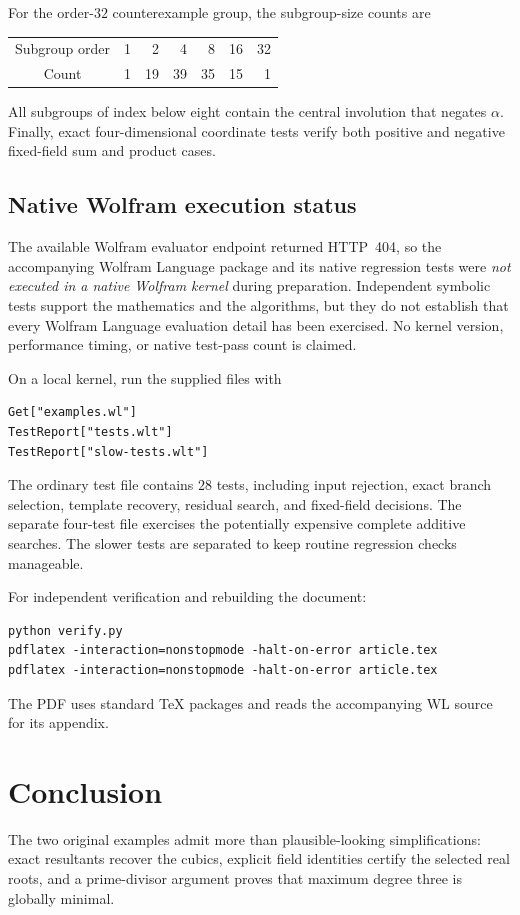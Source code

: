 \documentclass[11pt,letterpaper]{article}
\theoremstyle{definition}\newtheorem{definition}[theorem]{Definition}
\theoremstyle{remark}\newtheorem{remark}[theorem]{Remark}
\begin{document}
For the order-$32$ counterexample group, the subgroup-size counts are
\begin{center}
\begin{tabular}{crrrrrr}
\toprule
Subgroup order & 1 & 2 & 4 & 8 & 16 & 32\\
Count & 1 & 19 & 39 & 35 & 15 & 1\\\bottomrule
\end{tabular}
\end{center}
All subgroups of index below eight contain the central involution that negates $\alpha$. Finally, exact four-dimensional coordinate tests verify both positive and negative fixed-field sum and product cases.

\subsection{Native Wolfram execution status}
The available Wolfram evaluator endpoint returned HTTP~404, so the accompanying Wolfram Language package and its native regression tests were \emph{not executed in a native Wolfram kernel} during preparation. Independent symbolic tests support the mathematics and the algorithms, but they do not establish that every Wolfram Language evaluation detail has been exercised. No kernel version, performance timing, or native test-pass count is claimed.

On a local kernel, run the supplied files with
\begin{lstlisting}
Get["examples.wl"]
TestReport["tests.wlt"]
TestReport["slow-tests.wlt"]
\end{lstlisting}
The ordinary test file contains $28$ tests, including input rejection, exact branch selection, template recovery, residual search, and fixed-field decisions. The separate four-test file exercises the potentially expensive complete additive searches. The slower tests are separated to keep routine regression checks manageable.

For independent verification and rebuilding the document:
\begin{lstlisting}[language={}]
python verify.py
pdflatex -interaction=nonstopmode -halt-on-error article.tex
pdflatex -interaction=nonstopmode -halt-on-error article.tex
\end{lstlisting}
The PDF uses standard TeX packages and reads the accompanying WL source for its appendix.

\section{Conclusion}
The two original examples admit more than plausible-looking simplifications: exact resultants recover the cubics, explicit field identities certify the selected real roots, and a prime-divisor argument proves that maximum degree three is globally minimal.
\end{document}
